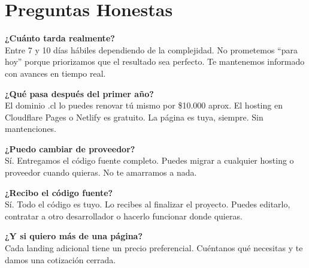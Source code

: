 \documentclass[11pt, a4paper]{article}
\begin{document}
  \vspace{3mm}

  \section*{Preguntas Honestas}

  \vspace{2mm}

  \noindent
  \textbf{\color{darkslate}
  ¿Cuánto tarda realmente?} \\[1mm]
  {\small\color{basicgray}Entre 7 y 10 días hábiles dependiendo de la complejidad. No prometemos ``para hoy'' porque priorizamos que el resultado sea perfecto. Te mantenemos informado con avances en tiempo real.}

  \vspace{3mm}

  \noindent
  \textbf{\color{darkslate}
  ¿Qué pasa después del primer año?} \\[1mm] {\small\color{basicgray}El dominio .cl lo puedes renovar tú mismo por \$10.000 aprox. El hosting en Cloudflare Pages o Netlify es gratuito. La página es tuya, siempre. Sin mantenciones.}

  \vspace{3mm}

  \noindent
  \textbf{\color{darkslate}
  ¿Puedo cambiar de proveedor?} \\[1mm]
  {\small\color{basicgray}Sí. Entregamos el código fuente completo. Puedes migrar a cualquier hosting o proveedor cuando quieras. No te amarramos a nada.}

  \vspace{3mm}

  \noindent
  \textbf{\color{darkslate}
  ¿Recibo el código fuente?} \\[1mm] {\small\color{basicgray}Sí. Todo el código es tuyo. Lo recibes al finalizar el proyecto. Puedes editarlo, contratar a otro desarrollador o hacerlo funcionar donde quieras.}

  \vspace{3mm}

  \noindent
  \textbf{\color{darkslate}
  ¿Y si quiero más de una página?} \\[1mm]
  {\small\color{basicgray}Cada landing adicional tiene un precio preferencial. Cuéntanos qué necesitas y te damos una cotización cerrada.}

  \vspace{3mm}
\end{document}
